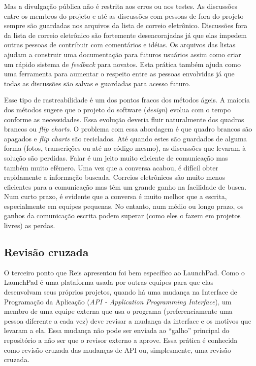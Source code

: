 Mas a divulgação pública não é restrita aos erros ou aos testes. As
discussões entre os membros do projeto e até as discussões com pessoas
de fora do projeto sempre são guardadas nos arquivos da lista de
correio eletrônico. Discussões fora da lista de correio eletrônico são
fortemente desencorajadas já que elas impedem outras pessoas de
contribuir com comentários e idéias. Os arquivos das listas ajudam a
construir uma documentação para futuros usuários assim como criar um
rápido sistema de \emph{feedback} para novatos. Esta prática também
ajuda como uma ferramenta para aumentar o respeito entre as pessoas
envolvidas já que todas as discussões são salvas e guardadas para
acesso futuro.

Esse tipo de rastreabilidade é um dos pontos fracos dos métodos
ágeis. A maioria dos métodos sugere que o projeto do software
(\emph{design}) evolua com o tempo conforme as necessidades. Essa
evolução deveria fluir naturalmente dos quadros brancos ou \emph{flip
  charts}. O problema com essa abordagem é que quadro brancos são
apagados e \emph{flip charts} são reciclados.  Até quando estes são
guardados de alguma forma (fotos, transcrições ou até no código
mesmo), as discussões que levaram à solução são perdidas. Falar é um
jeito muito eficiente de comunicação mas também muito efêmero. Uma vez
que a conversa acabou, é difícil obter rapidamente a informação
buscada. Correios eletrônicos são muito menos eficientes para a
comunicação mas têm um grande ganho na facilidade de busca. Num curto
prazo, é evidente que a conversa é muito melhor que a escrita,
especialmente em equipes pequenas. No entanto, num médio ou longo
prazo, os ganhos da comunicação escrita podem superar (como eles o
fazem em projetos livres) as perdas.

\subsection{Revisão cruzada}
\label{subsec:crossrev}

O terceiro ponto que Reis apresentou foi bem específico ao
LaunchPad. Como o LaunchPad é uma plataforma usada por outras equipes
para que elas desenvolvam seus próprios projetos, quando há uma
mudança na Interface de Programação da Aplicação (\emph{API -
  Application Programming Interface}), um membro de uma equipe externa
que usa o programa (preferenciamente uma pessoa diferente a cada vez)
deve revisar a mudança da interface e os motivos que levaram a
ela. Essa mudança não pode ser enviada ao ``galho'' principal do
repositório a não ser que o revisor externo a aprove. Essa prática é
conhecida como revisão cruzada das mudanças de API ou, simplesmente,
uma revisão cruzada.


